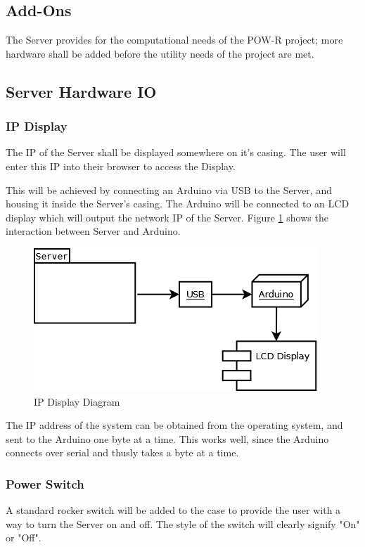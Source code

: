 
\subsection{Add-Ons}
The Server provides for the computational needs of the \ac{POW-R} project; 
more hardware shall be added before the utility needs of the project are met.

\subsection{Server Hardware IO}

\subsubsection{\ac{IP} Display}
The \ac{IP} of the Server shall be displayed somewhere on it's casing. 
The user will enter this \ac{IP} into their browser to access the Display.

This will be achieved by connecting an Arduino via \ac{USB} to the Server, and housing it inside the Server's casing. 
The Arduino will be connected to an \ac{LCD} display which will output the network \ac{IP} of the Server. 
Figure \ref{ArduinoLCD} shows the interaction between Server and Arduino.

\begin{figure}
\centering
\includegraphics[scale=0.5]{Hardware/images/ArduinoLCD.png}
\caption{\ac{IP} Display Diagram}
\label{ArduinoLCD}
\end{figure}

The \ac{IP} address of the system can be obtained from the operating system, and sent to the Arduino one byte at a time. 
This works well, since the Arduino connects over serial and thusly takes a byte at a time.

\subsubsection{Power Switch}
A standard rocker switch will be added to the case to provide the user with a way to turn the Server on and off. 
The style of the switch will clearly signify "On" or "Off".

